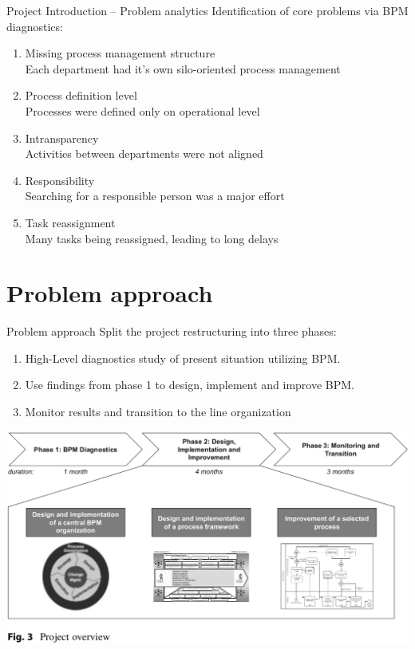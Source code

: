 \documentclass{beamer}
\begin{document}
\begin{frame}{Project Introduction -- Problem analytics}
    Identification of core problems via BPM diagnostics:
    \begin{enumerate}[$\circ$]
        \item Missing process management structure\\Each department had it's own silo-oriented process management
        \item Process definition level\\Processes were defined only on operational level
        \item Intransparency\\Activities between departments were not aligned
        \item Responsibility\\Searching for a responsible person was a major effort
        \item Task reassignment\\Many tasks being reassigned, leading to long delays
    \end{enumerate}    
\end{frame}

\section{Problem approach}
\begin{frame}{Problem approach}
    Split the project restructuring into three phases:
    \begin{enumerate}
        \item High-Level diagnostics study of present situation utilizing BPM.
        \item Use findings from phase 1 to design, implement and improve BPM.
        \item Monitor results and transition to the line organization
    \end{enumerate}
\end{frame}

\begin{frame}
    \begin{center}
        \includegraphics[width=1.0\textwidth]{proj_restructuring.png}
    \end{center}
\end{frame}
\end{document}
